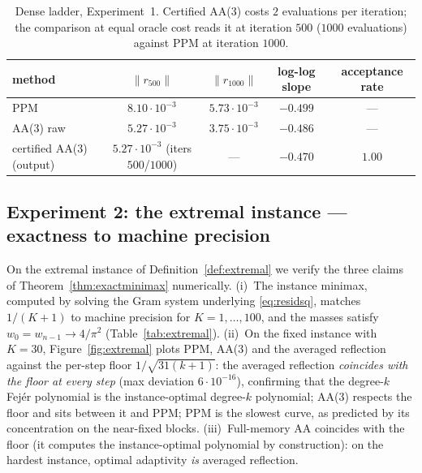 \documentclass[11pt]{article}
\theoremstyle{definition}
\theoremstyle{remark}
\newcommand{\norm}[1]{\| #1 \|}
\begin{document}
\begin{table}[htbp]
\centering\small
\caption{Dense ladder, Experiment~1. Certified AA(3) costs $2$ evaluations
per iteration; the comparison at equal oracle cost reads it at iteration
$500$ ($1000$ evaluations) against PPM at iteration $1000$.}
\label{tab:ladder}
{\small
\begin{tabular}{lcccc}
\toprule
method & $\norm{r_{500}}$ & $\norm{r_{1000}}$ & log-log slope &
acceptance rate\\
\midrule
PPM & $8.10\cdot10^{-3}$ & $5.73\cdot10^{-3}$ & $-0.499$ & ---\\
AA(3) raw & $5.27\cdot10^{-3}$ & $3.75\cdot10^{-3}$ & $-0.486$ & ---\\
certified AA(3) (output) & $5.27\cdot10^{-3}$ (iters $500$/$1000$) &
--- & $-0.470$ & $1.00$\\
\bottomrule
\end{tabular}}
\end{table}

\subsection{Experiment 2: the extremal instance --- exactness to machine
precision}\label{sec:expExtremal}

On the extremal instance of Definition~\ref{def:extremal} we verify the
three claims of Theorem~\ref{thm:exactminimax} numerically. (i)~The
instance minimax, computed by solving the Gram system underlying
\eqref{eq:residsq}, matches $1/(K+1)$ to machine precision for
$K=1,\dots,100$, and the masses satisfy $w_0=w_{n-1}\to4/\pi^2$
(Table~\ref{tab:extremal}). (ii)~On the fixed instance with $K=30$,
Figure~\ref{fig:extremal} plots PPM, AA(3) and the averaged reflection
against the per-step floor $1/\sqrt{31(k+1)}$: the averaged reflection
\emph{coincides with the floor at every step} (max deviation
$6\cdot10^{-16}$), confirming that the degree-$k$ Fej\'er polynomial is
the instance-optimal degree-$k$ polynomial; AA(3) respects the floor and
sits between it and PPM; PPM is the slowest curve, as predicted by its
concentration on the near-fixed blocks. (iii)~Full-memory AA coincides
with the floor (it computes the instance-optimal polynomial by
construction): on the hardest instance, optimal adaptivity \emph{is}
averaged reflection.
\end{document}
